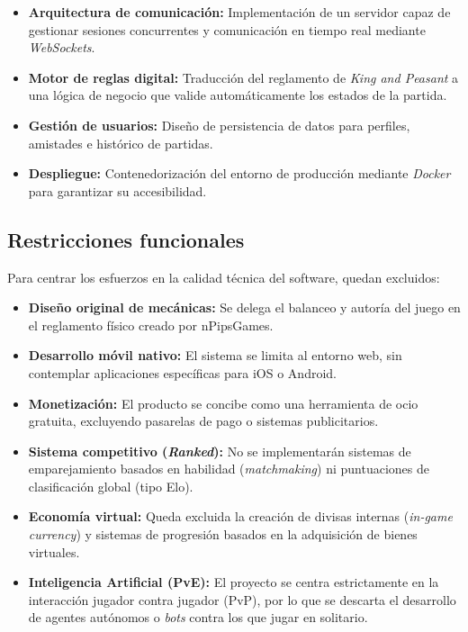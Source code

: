 \begin{itemize}
    \item \textbf{Arquitectura de comunicación:} Implementación de un servidor capaz de gestionar sesiones concurrentes y comunicación en tiempo real mediante \textit{WebSockets}.
    \item \textbf{Motor de reglas digital:} Traducción del reglamento de \textit{King and Peasant} a una lógica de negocio que valide automáticamente los estados de la partida.
    \item \textbf{Gestión de usuarios:} Diseño de persistencia de datos para perfiles, amistades e histórico de partidas.
    \item \textbf{Despliegue:} Contenedorización del entorno de producción mediante \textit{Docker} para garantizar su accesibilidad.
\end{itemize}

\subsection{Restricciones funcionales}

Para centrar los esfuerzos en la calidad técnica del software, quedan excluidos:

\begin{itemize}
    \item \textbf{Diseño original de mecánicas:} Se delega el balanceo y autoría del juego en el reglamento físico creado por nPipsGames.
    \item \textbf{Desarrollo móvil nativo:} El sistema se limita al entorno web, sin contemplar aplicaciones específicas para iOS o Android.
    \item \textbf{Monetización:} El producto se concibe como una herramienta de ocio gratuita, excluyendo pasarelas de pago o sistemas publicitarios.
    \item \textbf{Sistema competitivo (\textit{Ranked}):} No se implementarán sistemas de emparejamiento basados en habilidad (\textit{matchmaking}) ni puntuaciones de clasificación global (tipo Elo).
    \item \textbf{Economía virtual:} Queda excluida la creación de divisas internas (\textit{in-game currency}) y sistemas de progresión basados en la adquisición de bienes virtuales.
    \item \textbf{Inteligencia Artificial (PvE):} El proyecto se centra estrictamente en la interacción jugador contra jugador (PvP), por lo que se descarta el desarrollo de agentes autónomos o \textit{bots} contra los que jugar en solitario.
\end{itemize}

